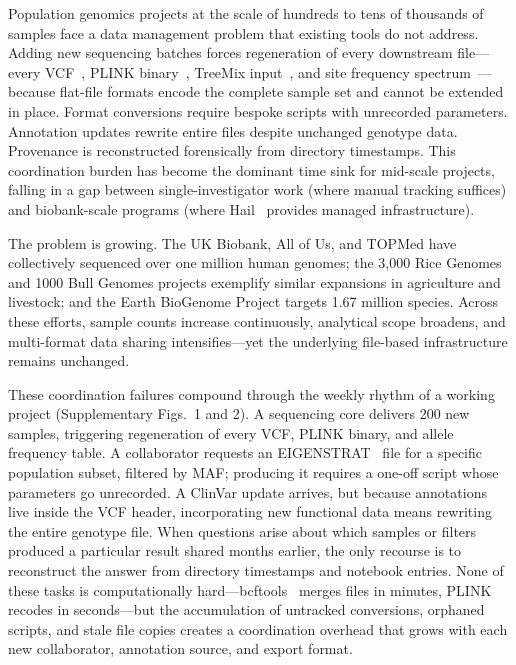 \documentclass[pdflatex,sn-nature]{sn-jnl}
\begin{document}
Population genomics projects at the scale of hundreds to tens of thousands of samples face a data management problem that existing tools do not address. Adding new sequencing batches forces regeneration of every downstream file---every VCF~\cite{danecek2011vcf}, PLINK binary~\cite{chang2015plink}, TreeMix input~\cite{pickrell2012treemix}, and site frequency spectrum~\cite{gutenkunst2009dadi}---because flat-file formats encode the complete sample set and cannot be extended in place. Format conversions require bespoke scripts with unrecorded parameters. Annotation updates rewrite entire files despite unchanged genotype data. Provenance is reconstructed forensically from directory timestamps. This coordination burden has become the dominant time sink for mid-scale projects, falling in a gap between single-investigator work (where manual tracking suffices) and biobank-scale programs (where Hail~\cite{hail} provides managed infrastructure).

The problem is growing. The UK Biobank, All of Us, and TOPMed have collectively sequenced over one million human genomes; the 3,000 Rice Genomes and 1000 Bull Genomes projects exemplify similar expansions in agriculture and livestock; and the Earth BioGenome Project targets 1.67 million species. Across these efforts, sample counts increase continuously, analytical scope broadens, and multi-format data sharing intensifies---yet the underlying file-based infrastructure remains unchanged.

These coordination failures compound through the weekly rhythm of a working project (Supplementary Figs.~1 and 2). A sequencing core delivers 200 new samples, triggering regeneration of every VCF, PLINK binary, and allele frequency table. A collaborator requests an EIGENSTRAT~\cite{patterson2006eigenstrat} file for a specific population subset, filtered by MAF; producing it requires a one-off script whose parameters go unrecorded. A ClinVar update arrives, but because annotations live inside the VCF header, incorporating new functional data means rewriting the entire genotype file. When questions arise about which samples or filters produced a particular result shared months earlier, the only recourse is to reconstruct the answer from directory timestamps and notebook entries. None of these tasks is computationally hard---bcftools~\cite{danecek2021bcftools} merges files in minutes, PLINK recodes in seconds---but the accumulation of untracked conversions, orphaned scripts, and stale file copies creates a coordination overhead that grows with each new collaborator, annotation source, and export format.
\end{document}
